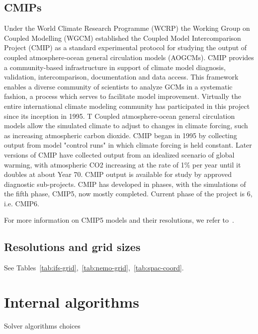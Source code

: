 \subsection{CMIPs}
Under the World Climate Research Programme (WCRP) the Working Group on Coupled Modelling (WGCM) established the Coupled Model Intercomparison Project (CMIP) as a standard experimental protocol for studying the output of coupled atmosphere-ocean general circulation models (AOGCMs). CMIP provides a community-based infrastructure in support of climate model diagnosis, validation, intercomparison, documentation and data access. This framework enables a diverse community of scientists to analyze GCMs in a systematic fashion, a process which serves to facilitate model improvement. Virtually the entire international climate modeling community has participated in this project since its inception in 1995. T
Coupled atmosphere-ocean general circulation models allow the simulated climate to adjust to changes in climate forcing, such as increasing atmospheric carbon dioxide. CMIP began in 1995 by collecting output from model "control runs" in which climate forcing is held constant. Later versions of CMIP have collected output from an idealized scenario of global warming, with atmospheric CO2 increasing at the rate of 1\% per year until it doubles at about Year 70. CMIP output is available for study by approved diagnostic sub-projects. 
CMIP has developed in phases, with the simulations of the fifth phase, CMIP5, now mostly completed. Current phase of the project is 6, i.e. CMIP6. 

For more information on CMIP5 models and their resolutions, we refer to~\cite{cmip5}.


\subsection{Resolutions and grid sizes}
See Tables~\ref{tab:ifs-grid},~\ref{tab:nemo-grid},~\ref{tab:spac-coord}.








\section{Internal algorithms}
Solver algorithms choices

% 